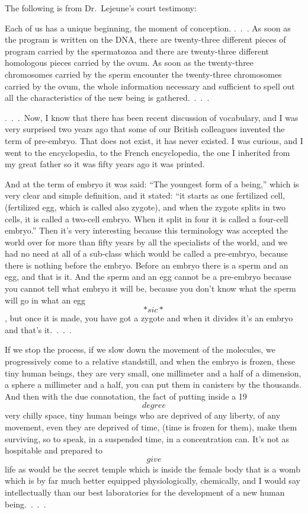 \documentclass[
]{book}
\begin{document}
The following is from Dr.~Lejeune's court testimony:

Each of us has a unique beginning, the moment of conception. .~.~. As soon as the program is written on the DNA, there are twenty-three different pieces of program carried by the spermatozoa and there are twenty-three different homologous pieces carried by the ovum. As soon as the twenty-three chromosomes carried by the sperm encounter the twenty-three chromosomes carried by the ovum, the whole information necessary and sufficient to spell out all the characteristics of the new being is gathered.~.~.~.

.~.~.~Now, I know that there has been recent discussion of vocabulary, and I was very surprised two years ago that some of our British colleagues invented the term of pre-embryo. That does not exist, it has never existed. I was curious, and I went to the encyclopedia, to the French encyclopedia, the one I inherited from my great father so it was fifty years ago it was printed.

And at the term of embryo it was said: ``The youngest form of a being,'' which is very clear and simple definition, and it stated: ``it starts as one fertilized cell, (fertilized egg, which is called also zygote), and when the zygote splits in two cells, it is called a two-cell embryo. When it split in four it is called a four-cell embryo.'' Then it's very interesting because this terminology was accepted the world over for more than fifty years by all the specialists of the world, and we had no need at all of a sub-class which would be called a pre-embryo, because there is nothing before the embryo. Before an embryo there is a sperm and an egg, and that is it. And the sperm and an egg cannot be a pre-embryo because you cannot tell what embryo it will be, because you don't know what the sperm will go in what an egg \[*sic*\], but once it is made, you have got a zygote and when it divides it's an embryo and that's it.~.~.~.

If we stop the process, if we slow down the movement of the molecules, we progressively come to a relative standstill, and when the embryo is frozen, these tiny human beings, they are very small, one millimeter and a half of a dimension, a sphere a millimeter and a half, you can put them in canisters by the thousands. And then with the due connotation, the fact of putting inside a 19 \[degree\] very chilly space, tiny human beings who are deprived of any liberty, of any movement, even they are deprived of time, (time is frozen for them), make them surviving, so to speak, in a suspended time, in a concentration can. It's not as hospitable and prepared to \[give\] life as would be the secret temple which is inside the female body that is a womb which is by far much better equipped physiologically, chemically, and I would say intellectually than our best laboratories for the development of a new human being.~.~.~.
\end{document}

